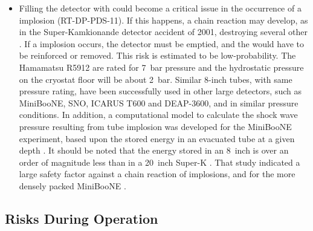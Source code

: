 \begin{itemize}

\item Filling the detector with  could become a critical issue in the occurrence of a  implosion (RT-DP-PDS-11). If this happens, a chain reaction may develop, as in the Super-Kamkionande detector accident of 2001, destroying several other . If a  implosion occurs, the detector must be emptied, and the  would have to be reinforced or removed. This risk is estimated to be low-probability. The Hamamatsu R5912  are rated for \SI{7}{bar} pressure and the hydrostatic pressure on the cryostat floor will be about \SI{2}{bar}. Similar 8-inch tubes, with same pressure rating, have been successfully used in other large detectors, such as MiniBooNE, SNO, ICARUS T600 and DEAP-3600, and in similar pressure conditions. In addition, a computational model to calculate the shock wave pressure resulting from tube implosion was developed for the MiniBooNE experiment, based upon the stored energy in an evacuated tube at a given depth \cite{Brice:2006ny}. It should be noted that the energy stored in an \SI{8}{inch}  is over an order of magnitude less than in a \SI{20}{inch} Super-K . That study indicated a large safety factor against a chain reaction of  implosions, and for the more densely packed MiniBooNE .

\end{itemize}


\subsection{Risks During Operation}
\label{sec:dp-pds-risks_operation}

